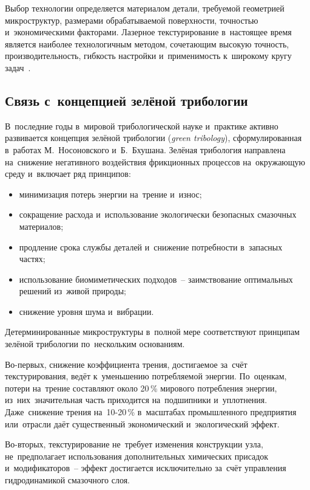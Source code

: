 Выбор технологии определяется материалом детали, требуемой геометрией микроструктур, размерами обрабатываемой поверхности, точностью и~экономическими факторами. Лазерное текстурирование в~настоящее время является наиболее технологичным методом, сочетающим высокую точность, производительность, гибкость настройки и~применимость к~широкому кругу задач~\cite{vladescu2019,petrovsky2020,bashmur2023a}.

\subsection{Связь с~концепцией зелёной трибологии}

В~последние годы в~мировой трибологической науке и~практике активно развивается концепция зелёной трибологии (\textit{green tribology}), сформулированная в~работах М.~Носоновского и~Б.~Бхушана. Зелёная трибология направлена на~снижение негативного воздействия фрикционных процессов на~окружающую среду и~включает ряд принципов:
\begin{itemize}
\item минимизация потерь энергии на~трение и~износ;
\item сокращение расхода и~использование экологически безопасных смазочных материалов;
\item продление срока службы деталей и~снижение потребности в~запасных частях;
\item использование биомиметических подходов~-- заимствование оптимальных решений из~живой природы;
\item снижение уровня шума и~вибрации.
\end{itemize}

Детерминированные микроструктуры в~полной мере соответствуют принципам зелёной трибологии по~нескольким основаниям.

Во-первых, снижение коэффициента трения, достигаемое за~счёт текстурирования, ведёт к~уменьшению потребляемой энергии. По~оценкам, потери на~трение составляют около 20\,\% мирового потребления энергии, из~них~значительная часть приходится на~подшипники и~уплотнения. Даже~снижение трения на~10-20\,\% в~масштабах промышленного предприятия или~отрасли даёт существенный экономический и~экологический эффект.

Во-вторых, текстурирование не~требует изменения конструкции узла, не~предполагает использования дополнительных химических присадок и~модификаторов~-- эффект достигается исключительно за~счёт управления гидродинамикой смазочного слоя.

